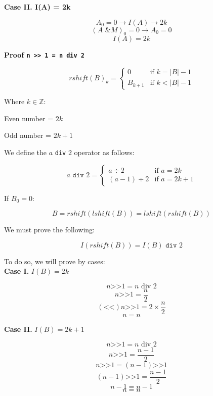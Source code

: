 \documentclass{article}
\begin{document}
\textbf{Case II. I(A) = 2k}

$$A_{0} = 0 \rightarrow I(A) \rightarrow 2k$$
$$(A \texttt{ \& } M)_{0} = 0 \rightarrow A_{0} = 0$$
$$I(A) = 2k$$

\newpage
\textbf{Proof \texttt{n >> 1 = n div 2}}

$$rshift(B)_{k} = \begin{cases}
0 & \mbox{if } k = |B|-1\\
B_{k + 1} & \mbox{if } k < |B| - 1
\end{cases}
$$

Where $k \in \mathbb{Z}$:

Even number = $2k$

Odd number = $2k + 1$

We define the $a$ \texttt{div} $2$ operator as follows:

$$a \texttt{ div } 2 = \begin{cases}
a \div 2 & \mbox{if } a = 2k\\
(a - 1) \div 2 & \mbox{if } a = 2k + 1
\end{cases}
$$

If $B_{0} = 0$:\

$$B = rshift(lshift(B)) = lshift(rshift(B))$$

We must prove the following:

$$I(rshift(B)) = I(B) \texttt{ div } 2$$

To do so, we will prove by cases:\\

\textbf{Case I.} $I(B) = 2k$

$$n \texttt{>>} 1 = n \text{ div } 2$$
$$n \texttt{>>} 1 = \frac{n}{2}$$
$$(\texttt{<<}) n \texttt{>>} 1 = 2 \times \frac{n}{2}$$
$$n = n$$

\textbf{Case II.} $I(B) = 2k + 1$

$$n \texttt{>>} 1 = n \text{ div } 2$$
$$n \texttt{>>} 1 = \frac{n - 1}{2}$$
$$n \texttt{>>} 1 = (n - 1) \texttt{>>} 1$$
$$(n - 1) \texttt{>>} 1 = \frac{n - 1}{2}$$
$$n - 1 = n - 1$$
$$n = n$$
\end{document}
